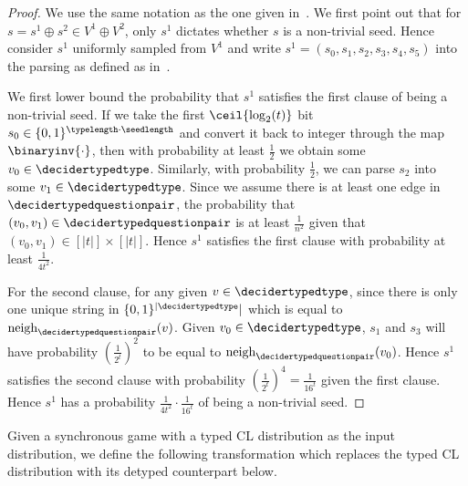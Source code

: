 \begin{proof}
	We use the same notation as the one given in~. We first point out that for $s = s^1 \oplus s^2 \in V^1 \oplus  V^2$, only $s^1$ dictates whether $s$ is a non-trivial seed. Hence consider $s^1$ uniformly sampled from $V^1$ and write $s^1 = (s_0,s_1, s_2, s_3, s_4, s_5)$ into the parsing as defined as in~. 
	
	We first lower bound the probability that $s^1$ satisfies the first clause of being a non-trivial seed. If we take the first $\ceil{\log_2(t)}$ bit $s_0 \in \{0,1\}^{\typelength \cdot \seedlength}$ and convert it back to integer through the map $\binaryinv{\cdot}$, then with probability at least $\frac{1}{2}$ we obtain some $v_0 \in \decidertypedtype$. Similarly, with probability $\frac{1}{2}$, we can parse $s_2$ into some $v_1 \in \decidertypedtype $. Since we assume there is at least one edge in $\decidertypedquestionpair$, the probability that $(v_0, v_1) \in \decidertypedquestionpair$ is at least $\frac{1}{n^2}$ given that $(v_0, v_1) \in [|t|] \times [|t|]$. Hence $s^1$ satisfies the first clause with probability at least $\frac{1}{4t^2}$. 
	
	For the second clause, for any given $v \in \decidertypedtype$, since there is only one unique string in $\{0,1\}^{|\decidertypedtype}|$ which is equal to $\text{neigh}_{\decidertypedquestionpair}(v)$. Given $v_0 \in \decidertypedtype$, $s_1$ and $s_3$ will have probability $\left(\frac{1}{2^t}\right)^2$ to be equal to $\text{neigh}_{\decidertypedquestionpair}(v_0)$. Hence $s^1$ satisfies the second clause with probability $\left(\frac{1}{2^t}\right)^4 = \frac{1}{16^t}$ given the first clause. Hence $s^1$ has a probability $\frac{1}{4t^2}\cdot \frac{1}{16^t} $ of being a non-trivial seed. 
\end{proof}


Given a synchronous game with a typed CL distribution as the input distribution, we define the following transformation which replaces the typed CL distribution with its detyped counterpart below. 

